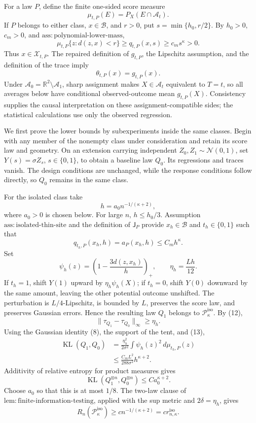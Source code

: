 For a law \(P\), define the finite one-sided score measure
\[
 \mu_{t,P}(E)=P_X(E\cap\mathcal A_t).
\]
If \(P\) belongs to either class, \(x\in\mathcal B\), and \(r>0\), put \(s=\min\{h_0,r/2\}\).  By \(h_0>0\), \(c_m>0\), and \(\mathrm{ass:polynomial\text{-}lower\text{-}mass}\),
\[
 \mu_{t,P}\{z:d(z,x)<r\}\ge q_{t,P}(x,s)\ge c_ms^{\kappa}>0. \tag{11}
\]
Thus \(x\in\mathcal X_{t,P}\).  The repaired definition of \(g_{t,P}\), the Lipschitz assumption, and the definition of the trace imply
\[
 \theta_{t,P}(x)=g_{t,P}(x). \tag{12}
\]
Under \(\mathcal A_0=\mathbb R^2\setminus\mathcal A_1\), sharp assignment makes \(X\in\mathcal A_t\) equivalent to \(T=t\), so all averages below have conditional observed-outcome mean \(g_{t,P}(X)\).  Consistency supplies the causal interpretation on these assignment-compatible sides; the statistical calculations use only the observed regression.

We first prove the lower bounds by subexperiments inside the same classes.  Begin with any member of the nonempty class under consideration and retain its score law and geometry.  On an extension carrying independent \(Z_0,Z_1\sim\mathcal N(0,1)\), set \(Y(s)=\sigma Z_s\), \(s\in\{0,1\}\), to obtain a baseline law \(Q_0\).  Its regressions and traces vanish.  The design conditions are unchanged, while the response conditions follow directly, so \(Q_0\) remains in the same class.

For the isolated class take
\[
 h=a_0n^{-1/(\kappa+2)},
\]
where \(a_0>0\) is chosen below.  For large \(n\), \(h\le h_0/3\).  Assumption \(\mathrm{ass:isolated\text{-}thin\text{-}site}\) and the definition of \(\mathsf J_P\) provide \(x_h\in\mathcal B\) and \(t_h\in\{0,1\}\) such that
\[
 q_{t_h,P}(x_h,h)=a_P(x_h,h)\le C_mh^{\kappa}. \tag{13}
\]
Set
\[
 \psi_h(z)=\left(1-\frac{3d(z,x_h)}h\right)_+,
 \qquad \eta_h=\frac{Lh}{12}.
\]
If \(t_h=1\), shift \(Y(1)\) upward by \(\eta_h\psi_h(X)\); if \(t_h=0\), shift \(Y(0)\) downward by the same amount, leaving the other potential outcome unshifted.  The perturbation is \(L/4\)-Lipschitz, is bounded by \(L\), preserves the score law, and preserves Gaussian errors.  Hence the resulting law \(Q_1\) belongs to \(\mathcal P_{\kappa}^{\mathrm{iso}}\).  By (12),
\[
 \|\tau_{Q_1}-\tau_{Q_0}\|_{\infty}\ge\eta_h. \tag{14}
\]
Using the Gaussian identity (8), the support of the tent, and (13),
\[
 \begin{aligned}
 \operatorname{KL}(Q_1,Q_0)
 &=\frac{\eta_h^2}{2\sigma^2}\int\psi_h(z)^2\,d\mu_{t_h,P}(z)\\
 &\le\frac{C_mL^2}{288\sigma^2}h^{\kappa+2}. 
 \end{aligned} \tag{15}
\]
Additivity of relative entropy for product measures gives
\[
 \operatorname{KL}(Q_1^{\otimes n},Q_0^{\otimes n})\le Ca_0^{\kappa+2}.
\]
Choose \(a_0\) so that this is at most \(1/8\).  The two-law clause of \(\mathrm{lem:finite\text{-}information\text{-}testing}\), applied with the sup metric and \(2\delta=\eta_h\), gives
\[
 R_n(\mathcal P_{\kappa}^{\mathrm{iso}})
 \ge c n^{-1/(\kappa+2)}=c r_{n,\kappa}^{\mathrm{iso}}. \tag{16}
\]

